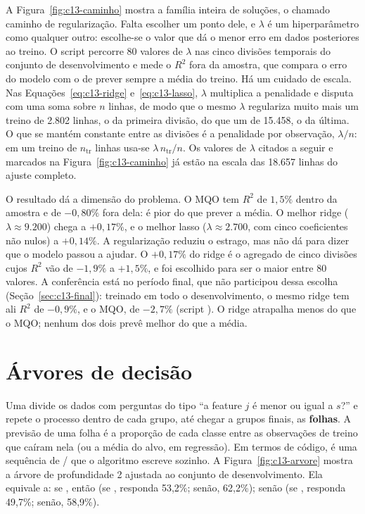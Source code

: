 A Figura~\ref{fig:c13-caminho} mostra a família inteira de soluções, o chamado caminho de regularização. Falta escolher um ponto dele, e $\lambda$ é um hiperparâmetro como qualquer outro: escolhe-se o valor que dá o menor erro em dados posteriores ao treino. O script  percorre 80 valores de $\lambda$ nas cinco divisões temporais do conjunto de desenvolvimento e mede o $R^2$ fora da amostra, que compara o erro do modelo com o de prever sempre a média do treino. Há um cuidado de escala. Nas Equações~\eqref{eq:c13-ridge} e~\eqref{eq:c13-lasso}, $\lambda$ multiplica a penalidade e disputa com uma soma sobre $n$ linhas, de modo que o mesmo $\lambda$ regulariza muito mais um treino de 2.802 linhas, o da primeira divisão, do que um de 15.458, o da última. O que se mantém constante entre as divisões é a penalidade por observação, $\lambda/n$: em um treino de $n_{\text{tr}}$ linhas usa-se $\lambda\, n_{\text{tr}}/n$. Os valores de $\lambda$ citados a seguir e marcados na Figura~\ref{fig:c13-caminho} já estão na escala das 18.657 linhas do ajuste completo.

O resultado dá a dimensão do problema. O MQO tem $R^2$ de $1,5\%$ dentro da amostra e de $-0,80\%$ fora dela: é pior do que prever a média. O melhor ridge ($\lambda \approx 9.200$) chega a $+0,17\%$, e o melhor lasso ($\lambda \approx 2.700$, com cinco coeficientes não nulos) a $+0,14\%$. A regularização reduziu o estrago, mas não dá para dizer que o modelo passou a ajudar. O $+0,17\%$ do ridge é o agregado de cinco divisões cujos $R^2$ vão de $-1,9\%$ a $+1,5\%$, e foi escolhido para ser o maior entre 80 valores. A conferência está no período final, que não participou dessa escolha (Seção~\ref{sec:c13-final}): treinado em todo o desenvolvimento, o mesmo ridge tem ali $R^2$ de $-0,9\%$, e o MQO, de $-2,7\%$ (script ). O ridge atrapalha menos do que o MQO; nenhum dos dois prevê melhor do que a média.

\section{Árvores de decisão}
\label{sec:c13-arvores}

Uma  divide os dados com perguntas do tipo ``a feature $j$ é menor ou igual a $s$?'' e repete o processo dentro de cada grupo, até chegar a grupos finais, as \textbf{folhas}. A previsão de uma folha é a proporção de cada classe entre as observações de treino que caíram nela (ou a média do alvo, em regressão). Em termos de código, é uma sequência de / que o algoritmo escreve sozinho. A Figura~\ref{fig:c13-arvore} mostra a árvore de profundidade 2 ajustada ao conjunto de desenvolvimento. Ela equivale a: se , então (se , responda 53,2\%; senão, 62,2\%); senão (se , responda 49,7\%; senão, 58,9\%).

